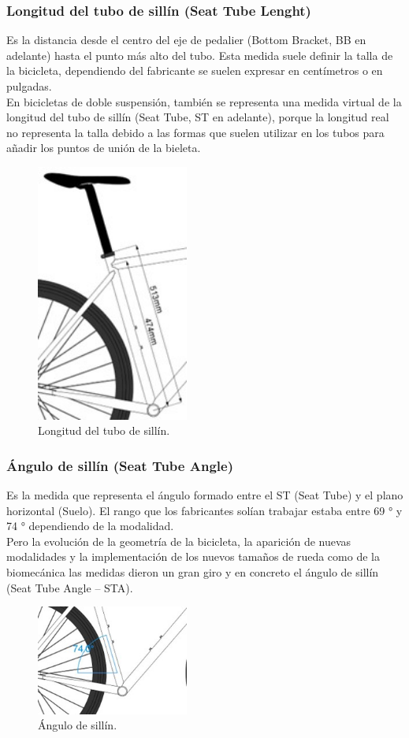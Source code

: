 \documentclass{article}
\begin{document}
\subsubsection{Longitud del tubo de sillín (Seat Tube Lenght)}
Es la distancia desde el centro del eje de pedalier (Bottom Bracket, BB en adelante) hasta el punto más alto del tubo. Esta medida suele definir la talla de la bicicleta, dependiendo del fabricante se suelen expresar en centímetros o en pulgadas. \\
En bicicletas de doble suspensión, también se representa una medida virtual de la longitud del tubo de sillín (Seat Tube, ST en adelante), porque la longitud real no representa la talla debido a las formas que suelen utilizar en los tubos para añadir los puntos de unión de la bieleta. 
\begin{figure} [htp]%
    \centering
    \includegraphics[width=50mm]{Imagen2.jpg} %
    \caption{Longitud del tubo de sillín.}
    \label{grafica}
\end{figure}

\subsubsection{Ángulo de sillín (Seat Tube Angle)}
Es la medida que representa el ángulo formado entre el ST (Seat Tube) y el plano horizontal (Suelo). El rango que los fabricantes solían trabajar estaba entre 69 ° y 74 ° dependiendo de la modalidad. \\
Pero la evolución de la geometría de la bicicleta, la aparición de nuevas modalidades y la implementación de los nuevos tamaños de rueda como de la biomecánica las medidas dieron un gran giro y en concreto el ángulo de sillín (Seat Tube Angle – STA).
\begin{figure} [htp]%
    \centering
    \includegraphics[width=50mm]{Imagen3.jpg} %
    \caption{Ángulo de sillín.}
    \label{grafica}
\end{figure}
\end{document}
